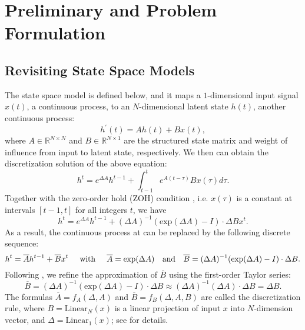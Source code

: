 
%

\section{Preliminary and Problem Formulation}
\label{SSM_theory}


\subsection{Revisiting State Space Models}
The state space model is defined below, and it maps a $1$-dimensional input signal $x(t)$, a continuous process, to an $N$-dimensional latent state $h(t)$, another continuous process:
\begin{equation}
\label{eq:SSM_con}
h^{\prime}(t) =A h(t)+B x(t),
\end{equation}
where $A \in \mathbb{R}^{N \times N}$ and $B \in \mathbb{R}^{N \times 1}$ are the structured state matrix and weight of influence from input to latent state, respectively. We then can obtain the discretization solution of the above equation:
\begin{equation}
        h^{t} = e^{\Delta A}h^{t-1} + \int_{t-1}^{t} e^{A(t-\tau)} Bx(\tau) d\tau.
\end{equation}
Together with the zero-order hold (ZOH) condition \citep{karafyllis2011nonlinear}, i.e. $x(\tau)$ is a constant at intervals $[t-1,t]$ for all integers $t$, we have
\begin{equation}
    h^{t} = e^{\Delta A}h^{t-1} + (\Delta A)^{-1}(\text{exp}(\Delta A)-I) \cdot \Delta B x^{t}.
\end{equation}
As a result, the continuous process at  can be replaced by the following discrete sequence:
\begin{equation}
\label{eq:SSM_dis}
h^t  =\overline{A} h^{t-1}+\overline{B} x^t \hspace{5mm}\text{with}\hspace{5mm}
\overline{A} = \text{exp}(\Delta A) \quad \text{and}   \quad \overline{B} = (\Delta A)^{-1}(\text{exp}(\Delta A)-I) \cdot \Delta B.
\end{equation}
Following \cite{gu2023mamba}, we refine the approximation of $\overline{B}$ using the first-order Taylor series:
\begin{equation}
    \overline{B} = (\Delta A)^{-1}(\text{exp}(\Delta A)-I) \cdot \Delta B \approx (\Delta A)^{-1}(\Delta A) \cdot \Delta B = \Delta B.
\end{equation}
The formulas $\overline{A}=f_A(\Delta, A)$ and $\overline{B}=f_B(\Delta, A, B)$ are called the discretization rule, where $B = \text{Linear}_N(x)$ is a linear projection of input $x$ into $N$-dimension vector, and $\Delta = \text{Linear}_1(x)$; see \citet{gu2021efficiently,gu2023mamba} for details.

